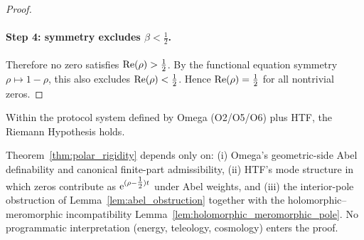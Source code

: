 \begin{proof}
\paragraph{Step 4: symmetry excludes $\beta<\tfrac{1}{2}$.}
Therefore no zero satisfies $\operatorname{Re}(\rho)>\tfrac{1}{2}$.
By the functional equation symmetry $\rho\mapsto 1-\rho$, this also excludes $\operatorname{Re}(\rho)<\tfrac{1}{2}$.
Hence $\operatorname{Re}(\rho)=\tfrac{1}{2}$ for all nontrivial zeros.
\end{proof}

\begin{corollary}
\label{cor:rh}
Within the protocol system defined by Omega (O2/O5/O6) plus HTF, the Riemann Hypothesis holds.
\end{corollary}

\begin{remark}
Theorem~\ref{thm:polar_rigidity} depends only on:
(i) Omega's geometric-side Abel definability and canonical finite-part admissibility,
(ii) HTF's mode structure in which zeros contribute as $\mathrm{e}^{(\rho-\tfrac{1}{2})t}$ under Abel weights, and
(iii) the interior-pole obstruction of Lemma~\ref{lem:abel_obstruction} together with the holomorphic--meromorphic incompatibility Lemma~\ref{lem:holomorphic_meromorphic_pole}.
No programmatic interpretation (energy, teleology, cosmology) enters the proof.
\end{remark}


